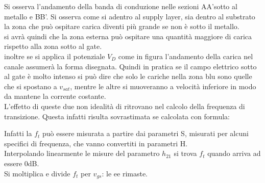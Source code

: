 Si osserva l'andamento della banda di conduzione nelle sezioni AA'sotto al metallo e BB'. Si osserva come si adentro al supply layer, sia dentro al substrato la zona che può ospitare carica diventi più grande se non è sotto il metallo.\\
si avrà quindi che la zona esterna può ospitare una quantità maggiore di carica rispetto alla zona sotto al gate.\\
inoltre se si applica il potenziale $V_D$ come in figura l'andamento della carica nel canale assumerà la forma disegnata. Quindi in pratica se il campo elettrico sotto al gate è molto intenso si può dire che solo le cariche nella zona blu sono quelle che si spostano a $v_{sat}$, mentre le altre si muoveranno a velocità inferiore in modo da mantene la corrente costante.\\
L'effetto di queste due non idealità di ritrovano nel calcolo della frequenza di transizione. Questa infatti risulta sovrastimata se calcolata con formula:



Infatti la $f_t$ può essere misurata a partire dai parametri S, misurati per alcuni specifici di frequenza, che vanno convertiti in parametri H.\\
Interpolando linearmente le misure del parametro $h_{21}$ si trova $f_t$ quando arriva ad essere 0dB.\\
Si moltiplica e divide $f_t$ per $v_{gs}$:
le ee rimaste.\\
